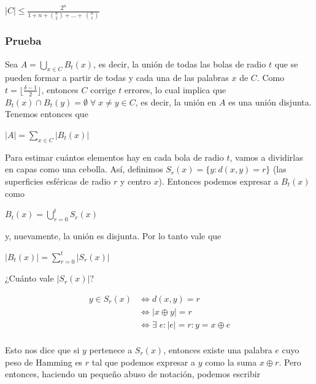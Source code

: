 \documentclass[10pt,a4paper]{article}
\begin{document}
\begin{center}
$\lvert C \rvert \leq \frac{2^n}{1 + n + {n \choose 2} + \dots + \ {n \choose t}}$
\end{center}

\subsubsection*{Prueba}

Sea $A = \bigcup\limits_{x \in C} B_t(x)$, es decir, la unión de todas las bolas de radio $t$ que se pueden formar a partir de todas y cada una de las palabras $x$ de $C$. Como $t = \lfloor \frac{\delta - 1}{2}\rfloor$, entonces $C$ corrige $t$ errores, lo cual implica que $B_t(x) \cap B_t(y) = \emptyset \; \forall \;x\neq y \in C $, es decir, la unión en $A$ es una unión disjunta. Tenemos entonces que

\begin{center}
$\lvert A \rvert = \sum\limits_{x \in C} \lvert B_t(x) \rvert$
\end{center}

Para estimar cuántos elementos hay en cada bola de radio $t$, vamos a dividirlas en capas como una cebolla. Así, definimos $S_r(x) = \{y : d(x, y) = r\}$ (las superficies esféricas de radio $r$ y centro $x$). Entonces podemos expresar a $B_t (x)$ como

\begin{center}
$B_t (x) = \bigcup\limits_{r = 0}^t S_r(x)$
\end{center}

y, nuevamente, la unión es disjunta. Por lo tanto vale que

\begin{center}
$\lvert B_t (x) \rvert = \sum\limits_{r = 0}^t \lvert S_r(x)\rvert$
\end{center}

¿Cuánto vale $\lvert S_r(x)\rvert$?

\begin{center}
\begin{align*} y \in S_r(x) & \Leftrightarrow d(x, y) = r\\ & \Leftrightarrow \lvert x \oplus y \rvert = r\\ & \Leftrightarrow \exists \; e : \lvert e \rvert = r : y = x \oplus e\\ \end{align*}
\end{center}

Esto nos dice que si $y$ pertenece a $S_r(x)$, entonces existe una palabra $e$ cuyo peso de Hamming es $r$ tal que podemos expresar a $y$ como la suma $x \oplus r$. Pero entonces, haciendo un pequeño abuso de notación, podemos escribir
\end{document}
